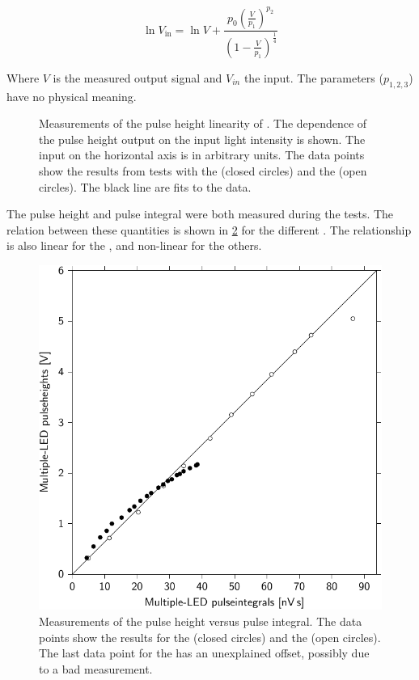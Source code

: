 \begin{equation}
    \ln V_{\mathrm{in}} = \ln V +
                          \frac{p_0 \left(\frac{V}{p_1}\right)^{p_2}}
                               {\left(1 - \frac{V}{p_1}\right)^{\frac{1}{4}}}
\end{equation}

Where $V$ is the measured output signal and $V_{in}$ the input. The parameters ($p_{1,2,3}$) have no physical meaning.

\begin{figure}
    \centering
    
    \caption{Measurements of the pulse height linearity of \pmts. The dependence of the pulse height output on the input light intensity is shown. The input on the horizontal axis is in arbitrary units. The data points show the results from tests with the \senstech \pmt (closed circles) and the \nikhef \pmt (open circles). The black line are fits to the data.}
    \label{fig:linearity_pmts}
\end{figure}

The pulse height and pulse integral were both measured during the tests. The relation between these quantities is shown in \cref{fig:ph_pi_compared_nikhef_senstech} for the different \pmts. The relationship is also linear for the \nikhef \pmt, and non-linear for the others.

\begin{figure}
    \centering
    \includegraphics[width=.7\linewidth]
                    {plots/station/ph_pi_compared_nikhef_senstech}
    \caption{Measurements of the pulse height versus pulse integral. The data points show the results for the \senstech \pmt (closed circles) and the \nikhef \pmt (open circles). The last data point for the \nikhef \pmt has an unexplained offset, possibly due to a bad measurement.}
    \label{fig:ph_pi_compared_nikhef_senstech}
\end{figure}


